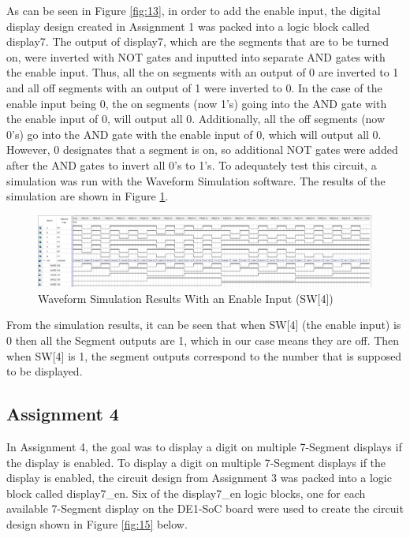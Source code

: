 \documentclass[
	letterpaper, %
	10pt, %
]{CSUniSchoolLabReport}
\begin{document}
\hspace{.5 in} As can be seen in Figure \ref{fig:13}, in order to add the enable input, the digital display design created in Assignment 1 was packed into a logic block called display7. The output of display7, which are the segments that are to be turned on, were inverted with NOT gates and inputted into separate AND gates with the enable input. Thus, all the on segments with an output of 0 are inverted to 1 and all off segments with an output of 1 were inverted to 0. In the case of the enable input being 0, the on segments (now 1’s) going into the AND gate with the enable input of 0, will output all 0. Additionally, all the off segments (now 0’s) go into the AND gate with the enable input of 0, which will output all 0. However, 0 designates that a segment is on, so additional NOT gates were added after the AND gates to invert all 0’s to 1’s. To adequately test this circuit, a simulation was run with the Waveform Simulation software. The results of the simulation are shown in Figure \ref{fig:14}.

\begin{figure}[H]
  \centering
  \includegraphics[width=.9\textwidth]{Figures/Sim_en.png}
  \caption{Waveform Simulation Results With an Enable Input (SW[4])}
  \label{fig:14}
\end{figure}

From the simulation results, it can be seen that when SW[4] (the enable input) is 0 then all the Segment outputs are 1, which in our case means they are off. Then when SW[4] is 1, the segment outputs correspond to the number that is supposed to be displayed. 

\subsection{Assignment 4}

In Assignment 4, the goal was to display a digit on multiple 7-Segment displays if the display is enabled. To display a digit on multiple 7-Segment displays if the display is enabled, the circuit design from Assignment 3 was packed into a logic block called display7_en. Six of the display7_en logic blocks, one for each available 7-Segment display on the DE1-SoC board were used to create the circuit design shown in Figure \ref{fig:15} below. 
\end{document}
